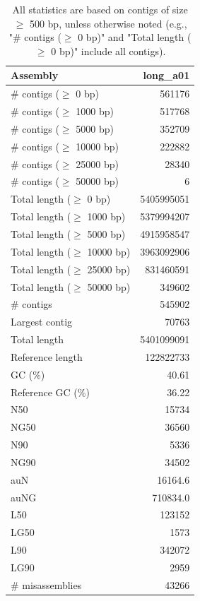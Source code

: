\documentclass[12pt,a4paper]{article}
\begin{document}
\begin{table}[ht]
\begin{center}
\caption{All statistics are based on contigs of size $\geq$ 500 bp, unless otherwise noted (e.g., "\# contigs ($\geq$ 0 bp)" and "Total length ($\geq$ 0 bp)" include all contigs).}
\begin{tabular}{|l*{1}{|r}|}
\hline
Assembly & long\_a01 \\ \hline
\# contigs ($\geq$ 0 bp) & 561176 \\ \hline
\# contigs ($\geq$ 1000 bp) & 517768 \\ \hline
\# contigs ($\geq$ 5000 bp) & 352709 \\ \hline
\# contigs ($\geq$ 10000 bp) & 222882 \\ \hline
\# contigs ($\geq$ 25000 bp) & 28340 \\ \hline
\# contigs ($\geq$ 50000 bp) & 6 \\ \hline
Total length ($\geq$ 0 bp) & 5405995051 \\ \hline
Total length ($\geq$ 1000 bp) & 5379994207 \\ \hline
Total length ($\geq$ 5000 bp) & 4915958547 \\ \hline
Total length ($\geq$ 10000 bp) & 3963092906 \\ \hline
Total length ($\geq$ 25000 bp) & 831460591 \\ \hline
Total length ($\geq$ 50000 bp) & 349602 \\ \hline
\# contigs & 545902 \\ \hline
Largest contig & 70763 \\ \hline
Total length & 5401099091 \\ \hline
Reference length & 122822733 \\ \hline
GC (\%) & 40.61 \\ \hline
Reference GC (\%) & 36.22 \\ \hline
N50 & 15734 \\ \hline
NG50 & 36560 \\ \hline
N90 & 5336 \\ \hline
NG90 & 34502 \\ \hline
auN & 16164.6 \\ \hline
auNG & 710834.0 \\ \hline
L50 & 123152 \\ \hline
LG50 & 1573 \\ \hline
L90 & 342072 \\ \hline
LG90 & 2959 \\ \hline
\# misassemblies & 43266 \\ \hline

\end{tabular}
\end{center}
\end{table}
\end{document}
